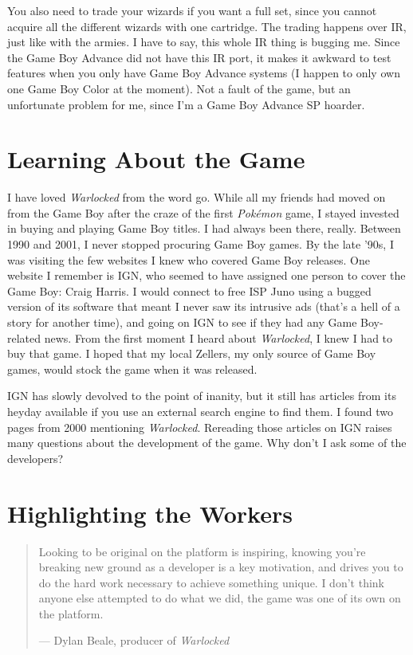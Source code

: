 \documentclass{book}
\begin{document}
You also need to trade your wizards if you want a full set, since you cannot acquire all the different wizards with one cartridge. The trading happens over IR, just like with the armies. I have to say, this whole IR thing is bugging me. Since the Game Boy Advance did not have this IR port, it makes it awkward to test features when you only have Game Boy Advance systems (I happen to only own one Game Boy Color at the moment). Not a fault of the game, but an unfortunate problem for me, since I’m a Game Boy Advance SP hoarder.\par
\FloatBarrier\section*{Learning About the Game}
I have loved \emph{Warlocked} from the word go. While all my friends had moved on from the Game Boy after the craze of the first \emph{Pokémon} game, I stayed invested in buying and playing Game Boy titles. I had always been there, really. Between 1990 and 2001, I never stopped procuring Game Boy games. By the late ’90s, I was visiting the few websites I knew who covered Game Boy releases. One website I remember is IGN, who seemed to have assigned one person to cover the Game Boy: Craig Harris. I would connect to free ISP Juno using a bugged version of its software that meant I never saw its intrusive ads (that’s a hell of a story for another time), and going on IGN to see if they had any Game Boy-related news. From the first moment I heard about \emph{Warlocked}, I knew I had to buy that game. I hoped that my local Zellers, my only source of Game Boy games, would stock the game when it was released.\par
IGN has slowly devolved to the point of inanity, but it still has articles from its heyday available if you use an external search engine to find them. I found two pages from 2000 mentioning \emph{Warlocked}. Rereading those articles on IGN raises many questions about the development of the game. Why don’t I ask some of the developers?\par
\FloatBarrier\section*{Highlighting the Workers}
\begin{quote}
Looking to be original on the platform is inspiring, knowing you’re breaking new ground as a developer is a key motivation, and drives you to do the hard work necessary to achieve something unique. I don’t think anyone else attempted to do what we did, the game was one of its own on the platform.\par
— Dylan Beale, producer of \emph{Warlocked}\par
\end{quote} \par
\end{document}
